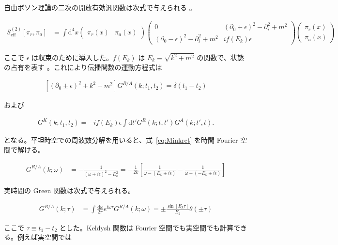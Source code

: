 \documentclass[a4paper,11pt]{ltjsarticle}
\numberwithin{equation}{section}
\def\pia{\pi_{a}}
\def\pir{\pi_{r}}
\newcommand{\dd}{\mathrm{d}}
\newcommand{\ee}{e}
\newcommand{\Eq}[1]{Eq.~(\ref{#1})}
\renewcommand{\Eq}[1]{式~\eqref{#1}}
\begin{document}
自由ボソン理論の二次の開放有効汎関数は次式で与えられる \cite{Kamenev:2009jj}。

\begin{align}
S^{(2)}_{\mathrm{eff}} \left[\pir,\pia\right] &= \int \dd^4 x  \begin{pmatrix}
\pir(x) & \pia(x)
\end{pmatrix} \begin{pmatrix}
0 & (\partial_0 + \epsilon)^2 - \partial_i^2 + m^2 \\
(\partial_0 - \epsilon)^2 - \partial_i^2 + m^2  & i f(E_k)\epsilon
\end{pmatrix} \begin{pmatrix}
\pir(x) \\ \pia(x)
\end{pmatrix}
\end{align}

ここで $\epsilon$ は収束のために導入した。$f(E_k)$ は $E_k\equiv\sqrt{k^2+m^2}$ の関数で、状態の占有を表す \cite{Kamenev:2009jj}。これにより伝播関数の運動方程式は

\begin{align}\label{eq:Minkret}
\left[(\partial_0 \pm \epsilon)^2 + k^2 + m^2 \right] G^{R/A} (k; t_1, t_2) =  \delta(t_1-t_2)			 
\end{align}

および

\begin{align}
G^K (k;t_1,t_2) = - i f(E_k) \epsilon \int \dd t' G^{R} (k;t,t') G^{A} (k;t',t).
\end{align}

となる。平坦時空での周波数分解を用いると、\Eq{eq:Minkret} を時間 Fourier 空間で解ける。

\begin{align}
G^{R/A} (k; \omega) &= - \frac{1}{(\omega \mp i \epsilon)^2 - E_k^2}= -\frac{1}{2k} \left[ \frac{1}{\omega- (E_k\pm i\epsilon)} - \frac{1}{\omega- (-E_k\pm i\epsilon)}   \right]
\end{align}

実時間の Green 関数は次式で与えられる。

\begin{align}\label{eq:retardedM4}
G^{R/A} (k; \tau) &= \int \frac{\dd \omega}{2\pi} \ee^{i \omega \tau} G^{R/A} (k; \omega) =\pm \frac{\sin \left[E_k \tau\right]}{E_k}\theta\left(\pm \tau\right)
\end{align}

ここで $\tau\equiv t_1-t_2$ とした。Keldysh 関数は Fourier 空間でも実空間でも計算できる。例えば実空間では
\end{document}
